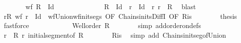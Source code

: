 \begin{isabellebody}
\ \ \ \ \isamarkupfalse%
\ \isamarkupfalse%
\ {\isachardoublequoteopen}wf\ {\isacharparenleft}{\kern0pt}{\isacharparenleft}{\kern0pt}{\isasymUnion}R{\isacharparenright}{\kern0pt}\ {\isacharminus}{\kern0pt}\ Id{\isacharparenright}{\kern0pt}{\isachardoublequoteclose}\isanewline
\ \ \ \ \isamarkupfalse%
\ {\isacharminus}{\kern0pt}\isanewline
\ \ \ \ \ \ \isamarkupfalse%
\ {\isachardoublequoteopen}{\isacharparenleft}{\kern0pt}{\isasymUnion}R{\isacharparenright}{\kern0pt}\ {\isacharminus}{\kern0pt}\ Id\ {\isacharequal}{\kern0pt}\ {\isasymUnion}{\isacharbraceleft}{\kern0pt}r\ {\isacharminus}{\kern0pt}\ Id\ {\isacharbar}{\kern0pt}\ r{\isachardot}{\kern0pt}\ r\ {\isasymin}\ R{\isacharbraceright}{\kern0pt}{\isachardoublequoteclose}\ \isamarkupfalse%
\ blast\isanewline
\ \ \ \ \ \ \isamarkupfalse%
\ {\isacartoucheopen}{\isasymforall}r{\isasymin}R{\isachardot}{\kern0pt}\ wf\ {\isacharparenleft}{\kern0pt}r\ {\isacharminus}{\kern0pt}\ Id{\isacharparenright}{\kern0pt}{\isacartoucheclose}\ \ wf{\isacharunderscore}{\kern0pt}Union{\isacharunderscore}{\kern0pt}wf{\isacharunderscore}{\kern0pt}init{\isacharunderscore}{\kern0pt}segs\ {\isacharbrackleft}{\kern0pt}OF\ Chains{\isacharunderscore}{\kern0pt}inits{\isacharunderscore}{\kern0pt}DiffI\ {\isacharbrackleft}{\kern0pt}OF\ Ris{\isacharbrackright}{\kern0pt}{\isacharbrackright}{\kern0pt}\isanewline
\ \ \ \ \ \ \isamarkupfalse%
\ {\isacharquery}{\kern0pt}thesis\ \isamarkupfalse%
\ fastforce\isanewline
\ \ \ \ \isamarkupfalse%
\isanewline
\ \ \ \ \isamarkupfalse%
\ \isamarkupfalse%
\ {\isachardoublequoteopen}Well{\isacharunderscore}{\kern0pt}order\ {\isacharparenleft}{\kern0pt}{\isasymUnion}R{\isacharparenright}{\kern0pt}{\isachardoublequoteclose}\isanewline
\ \ \ \ \ \ \isamarkupfalse%
\ {\isacharparenleft}{\kern0pt}simp\ add{\isacharcolon}{\kern0pt}order{\isacharunderscore}{\kern0pt}on{\isacharunderscore}{\kern0pt}defs{\isacharparenright}{\kern0pt}\isanewline
\ \ \ \ \isamarkupfalse%
\ \isamarkupfalse%
\ {\isachardoublequoteopen}{\isasymforall}r\ {\isasymin}\ R{\isachardot}{\kern0pt}\ r\ initial{\isacharunderscore}{\kern0pt}segment{\isacharunderscore}{\kern0pt}of\ {\isasymUnion}R{\isachardoublequoteclose}\isanewline
\ \ \ \ \ \ \isamarkupfalse%
\ Ris\ \isamarkupfalse%
\ {\isacharparenleft}{\kern0pt}simp\ add{\isacharcolon}{\kern0pt}\ Chains{\isacharunderscore}{\kern0pt}init{\isacharunderscore}{\kern0pt}seg{\isacharunderscore}{\kern0pt}of{\isacharunderscore}{\kern0pt}Union{\isacharparenright}{\kern0pt}\isanewline

\end{isabellebody}
